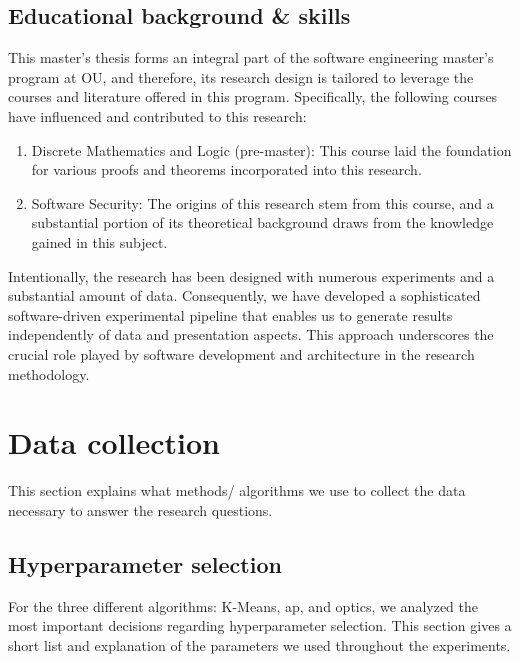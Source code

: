 \subsection{Educational background \& skills}
This master's thesis forms an integral part of the software engineering master's program at OU, and therefore, its research design is tailored to leverage the courses and literature offered in this program. Specifically, the following courses have influenced and contributed to this research:
\begin{enumerate}
    \item Discrete Mathematics and Logic (pre-master): This course laid the foundation for various proofs and theorems incorporated into this research.
    \item Software Security: The origins of this research stem from this course, and a substantial portion of its theoretical background draws from the knowledge gained in this subject.
\end{enumerate}
Intentionally, the research has been designed with numerous experiments and a substantial amount of data. Consequently, we have developed a sophisticated software-driven experimental pipeline that enables us to generate results independently of data and presentation aspects. This approach underscores the crucial role played by software development and architecture in the research methodology.
\section{Data collection}
This section explains what methods/ algorithms we use to collect the data necessary to answer the research questions.
\subsection{Hyperparameter selection}
For the three different algorithms: K-Means, \gls{ap}, and \gls{optics}, we analyzed the most important decisions regarding hyperparameter selection.
This section gives a short list and explanation of the parameters we used throughout the experiments.
